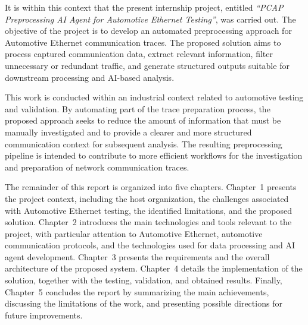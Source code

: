 It is within this context that the present internship project, entitled \textit{``PCAP Preprocessing AI Agent for Automotive Ethernet Testing''}, was carried out. The objective of the project is to develop an automated preprocessing approach for Automotive Ethernet communication traces. The proposed solution aims to process captured communication data, extract relevant information, filter unnecessary or redundant traffic, and generate structured outputs suitable for downstream processing and AI-based analysis.

This work is conducted within an industrial context related to automotive testing and validation. By automating part of the trace preparation process, the proposed approach seeks to reduce the amount of information that must be manually investigated and to provide a clearer and more structured communication context for subsequent analysis. The resulting preprocessing pipeline is intended to contribute to more efficient workflows for the investigation and preparation of network communication traces.

The remainder of this report is organized into five chapters. Chapter~1 presents the project context, including the host organization, the challenges associated with Automotive Ethernet testing, the identified limitations, and the proposed solution. Chapter~2 introduces the main technologies and tools relevant to the project, with particular attention to Automotive Ethernet, automotive communication protocols, and the technologies used for data processing and AI agent development. Chapter~3 presents the requirements and the overall architecture of the proposed system. Chapter~4 details the implementation of the solution, together with the testing, validation, and obtained results. Finally, Chapter~5 concludes the report by summarizing the main achievements, discussing the limitations of the work, and presenting possible directions for future improvements.